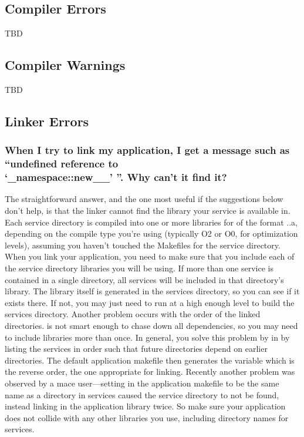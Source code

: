 \subsection{Compiler Errors}
\label{faq:compiler_errors}

TBD

\subsection{Compiler Warnings}
\label{faq:compiler_warnings}

TBD

\subsection{Linker Errors}
\label{faq:linker_errors}

\subsubsection*{When I try to link my application, I get a message such
as ``undefined reference to\\
`\_namespace::new\_\_'
''.  Why can't it find it?}

The straightforward answer, and the one most useful if the suggestions
below don't help, is that the linker cannot find the library your
service is available in.  Each service directory is compiled into one or
more libraries for of the format
..a, depending on the
compile type you're using (typically O2 or O0, for optimization levels),
assuming you haven't touched the Makefiles for the service directory.
When you link your application, you need to make sure that you include
each of the service directory libraries you will be using.  If more than
one service is contained in a single directory, all services will be
included in that directory's library.  The library itself is generated
in the services directory, so you can see if it exists there.  If not,
you may just need to run  at a high enough level to build
the services directory.  Another problem occurs with the order of the
linked directories.   is not smart enough to chase down all
dependencies, so you may need to include libraries more than once.  In
general, you solve this problem by in
 by listing the services in order
such that future directories depend on earlier directories.  The default
application makefile then generates the 
variable which is the reverse order, the one appropriate for linking.
Recently another problem was observed by a mace user---setting
 in the application makefile to be the same name
as a directory in services caused the service directory to not be found,
instead linking in the application library twice.  So make sure your
application  does not collide with any other
libraries you use, including directory names for services.

